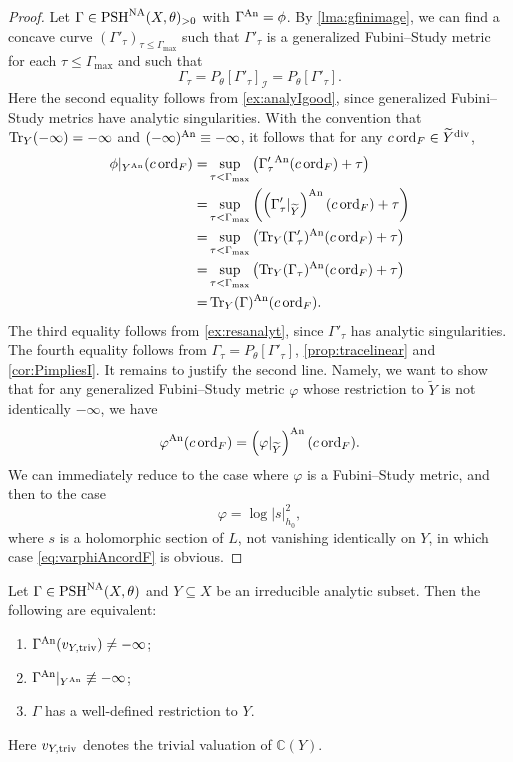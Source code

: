\begin{proof}
    Let $\Gamma\in \mathrm{PSH}^{\mathrm{NA}}(X,\theta)_{>0}$ with $\Gamma^{\mathrm{An}}=\phi$. By \cref{lma:gfinimage}, we can find a concave curve $(\Gamma'_{\tau})_{\tau\leq \Gamma_{\max}}$ such that $\Gamma'_{\tau}$ is a generalized Fubini--Study metric for each $\tau\leq \Gamma_{\max}$ and such that
    \[
    \Gamma_{\tau}=P_{\theta}[\Gamma'_{\tau}]_{\mathcal{I}}=P_{\theta}[\Gamma'_{\tau}].
    \]
    Here the second equality follows from \cref{ex:analyIgood}, since generalized Fubini--Study metrics have analytic singularities.
    With the convention that $\operatorname{Tr}_Y(-\infty)=-\infty$ and $(-\infty)^{\mathrm{An}}\equiv -\infty$, it follows that for any $c\operatorname{ord}_F\in \widetilde{Y}^{\operatorname{div}}$,
    \[
    \begin{aligned}
    \phi|_{Y^{\mathrm{An}}}(c\operatorname{ord}_F)=&\sup_{\tau<\Gamma_{\max}} \left(\Gamma'_{\tau}{}^{\mathrm{An}}(c\operatorname{ord}_F)+\tau\right)\\
    =& \sup_{\tau<\Gamma_{\max}} \left(\left(\Gamma'_{\tau}|_{\widetilde{Y}}\right)^{\mathrm{An}}(c\operatorname{ord}_F)+\tau\right)\\
    =& \sup_{\tau<\Gamma_{\max}} \left(\operatorname{Tr}_Y(\Gamma'_{\tau})^{\mathrm{An}}(c\operatorname{ord}_F)+\tau\right)\\
     =& \sup_{\tau<\Gamma_{\max}} \left(\operatorname{Tr}_Y(\Gamma_{\tau})^{\mathrm{An}}(c\operatorname{ord}_F)+\tau\right)\\
    =& \operatorname{Tr}_Y(\Gamma)^{\mathrm{An}}(c\operatorname{ord}_F).
    \end{aligned}
    \]
    The third equality follows from \cref{ex:resanalyt}, since $\Gamma'_{\tau}$ has analytic singularities. The fourth equality follows from $\Gamma_{\tau}=P_{\theta}[\Gamma'_{\tau}]$, \cref{prop:tracelinear} and \cref{cor:PimpliesI}. It remains to justify the second line. Namely, we want to show that for any generalized Fubini--Study metric $\varphi$ whose restriction to $\widetilde{Y}$ is not identically $-\infty$, we have
    \begin{equation}\label{eq:varphiAncordF}
    \varphi^{\mathrm{An}}(c\operatorname{ord}_F)=\left(\varphi|_{\widetilde{Y}}\right)^{\mathrm{An}}(c\operatorname{ord}_F).
    \end{equation}
    We can immediately reduce to the case where $\varphi$ is a Fubini--Study metric, and then to the case
    \[
    \varphi=\log |s|_{h_0}^2,
    \]
    where $s$ is a holomorphic section of $L$, not vanishing identically on $Y$, in which case \eqref{eq:varphiAncordF} is obvious.
\end{proof}


\begin{lemma}\label{lma:non-trivrest}
    Let $\Gamma\in \mathrm{PSH}^{\mathrm{NA}}(X,\theta)$ and $Y\subseteq X$ be an irreducible analytic subset. Then the following are equivalent:
    \begin{enumerate}
    \item\label{itm:lma:non-trivrest:1} $\Gamma^{\mathrm{An}}(v_{Y,\mathrm{triv}})\neq -\infty$;
    \item\label{itm:lma:non-trivrest:2} $\Gamma^{\mathrm{An}}|_{Y^{\mathrm{An}}}\not\equiv -\infty$;
    \item\label{itm:lma:non-trivrest:3} $\Gamma$ has a well-defined restriction to $Y$.
\end{enumerate}
\end{lemma}
Here $v_{Y,\mathrm{triv}}$ denotes the trivial valuation of $\mathbb{C}(Y)$.


